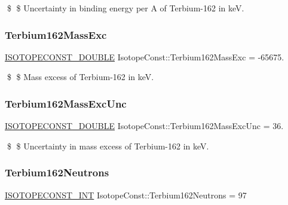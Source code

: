 \$ \$ Uncertainty in binding energy per A of Terbium-\/162 in keV. \mbox{\label{group___isotope_const-_terbium-_tb162_gad6b545a93fc5ac5f5871294eb4b78ad8}} 
\subsubsection{\texorpdfstring{Terbium162\+Mass\+Exc}{Terbium162MassExc}}
{\footnotesize\ttfamily \mbox{\hyperlink{group___isotope_const-_macros_ga8f45a7272ce02c0b4c65c44636ed719a}{I\+S\+O\+T\+O\+P\+E\+C\+O\+N\+S\+T\+\_\+\+D\+O\+U\+B\+LE}} Isotope\+Const\+::\+Terbium162\+Mass\+Exc = -\/65675.}

\$ \$ Mass excess of Terbium-\/162 in keV. \mbox{\label{group___isotope_const-_terbium-_tb162_ga8d68ec9b95017b82d02250c342c8461d}} 
\subsubsection{\texorpdfstring{Terbium162\+Mass\+Exc\+Unc}{Terbium162MassExcUnc}}
{\footnotesize\ttfamily \mbox{\hyperlink{group___isotope_const-_macros_ga8f45a7272ce02c0b4c65c44636ed719a}{I\+S\+O\+T\+O\+P\+E\+C\+O\+N\+S\+T\+\_\+\+D\+O\+U\+B\+LE}} Isotope\+Const\+::\+Terbium162\+Mass\+Exc\+Unc = 36.}

\$ \$ Uncertainty in mass excess of Terbium-\/162 in keV. \mbox{\label{group___isotope_const-_terbium-_tb162_gaa49aa0ff765c8b1cabda4f3fae212071}} 
\subsubsection{\texorpdfstring{Terbium162\+Neutrons}{Terbium162Neutrons}}
{\footnotesize\ttfamily \mbox{\hyperlink{group___isotope_const-_macros_ga5f18360b3e99483a35c32d789e62621c}{I\+S\+O\+T\+O\+P\+E\+C\+O\+N\+S\+T\+\_\+\+I\+NT}} Isotope\+Const\+::\+Terbium162\+Neutrons = 97}

